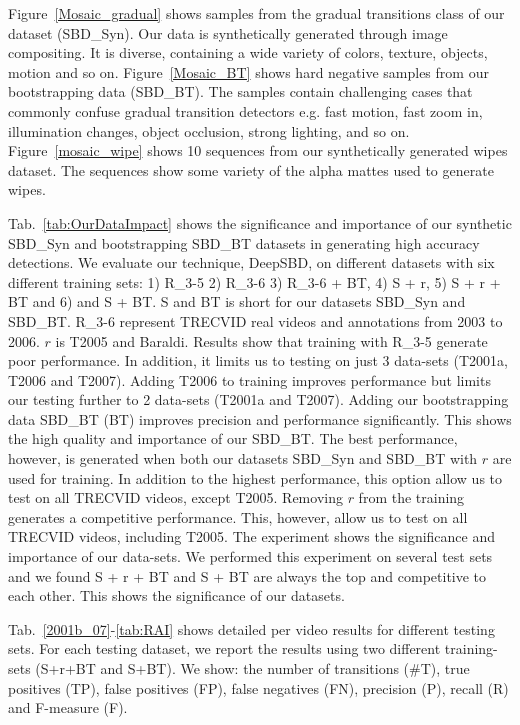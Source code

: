 \documentclass[journal]{IEEEtran}
\begin{document}
Figure~\ref{Mosaic_gradual} shows samples from the gradual transitions class of our dataset (SBD\_Syn). Our data is synthetically generated through image compositing. It is diverse, containing a wide variety of colors, texture, objects, motion and so on. Figure~\ref{Mosaic_BT} shows hard negative samples from our bootstrapping data (SBD\_BT). The samples contain challenging cases that commonly confuse gradual transition detectors e.g. fast motion, fast zoom in, illumination changes, object occlusion, strong lighting, and so on. Figure~\ref{mosaic_wipe} shows 10 sequences from our synthetically generated wipes dataset. The sequences show some variety of the alpha mattes used to generate wipes. 
 





Tab.~\ref{tab:OurDataImpact} shows the significance and importance of our synthetic SBD\_Syn and bootstrapping SBD\_BT datasets in generating high accuracy detections. We evaluate our technique, DeepSBD, on different datasets with six different training sets: 1) R\_3-5 2) R\_3-6 3) R\_3-6 + BT, 4) S + r, 5) S + r + BT and 6) and S + BT. S and BT is short for our datasets SBD\_Syn and SBD\_BT. R\_3-6 represent TRECVID real videos and annotations from 2003 to 2006. $r$ is T2005 and Baraldi. Results show that training with R\_3-5  generate poor performance. In addition, it limits us to testing on just 3 data-sets (T2001a, T2006 and T2007). Adding T2006 to training improves performance but limits our testing further to 2 data-sets (T2001a and T2007). Adding our bootstrapping data SBD\_BT (BT) improves precision and performance significantly. This shows the high quality and importance of our SBD\_BT. The best performance, however, is generated when both our datasets SBD\_Syn and SBD\_BT with $r$ are used for training. In addition to the highest performance, this option allow us to test on all TRECVID videos, except T2005. Removing $r$ from the training generates a competitive performance. This, however, allow us to test on all TRECVID videos, including T2005. The experiment shows the significance and importance of our data-sets. We performed this experiment on several test sets and we found S + r + BT and S + BT are always the top and competitive to each other. This shows the significance of our datasets. 

Tab.~\ref{2001b_07}-\ref{tab:RAI} shows detailed per video results for different testing sets. For each testing dataset, we report the results using two different training-sets (S+r+BT and S+BT). We show: the number of transitions (\#T), true positives (TP), false positives (FP), false negatives (FN), precision (P), recall (R) and F-measure (F).
\end{document}
